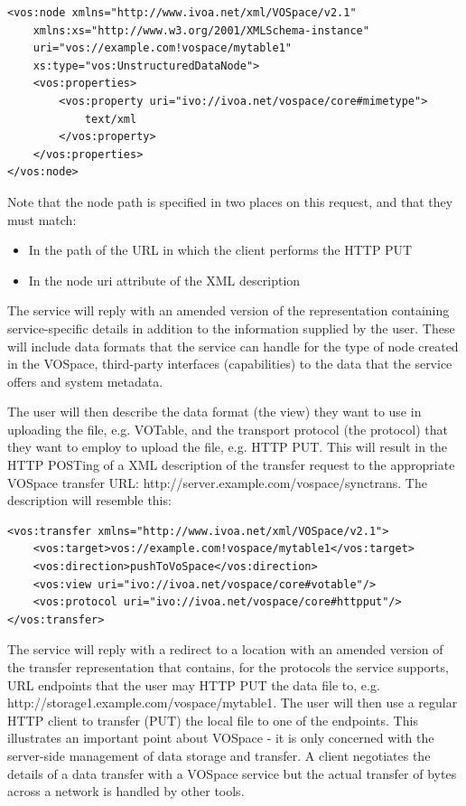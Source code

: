 \documentclass[11pt,a4paper]{ivoa}
\begin{document}
\begin{lstlisting}
<vos:node xmlns="http://www.ivoa.net/xml/VOSpace/v2.1"
    xmlns:xs="http://www.w3.org/2001/XMLSchema-instance" 
    uri="vos://example.com!vospace/mytable1"
    xs:type="vos:UnstructuredDataNode">  
    <vos:properties> 
        <vos:property uri="ivo://ivoa.net/vospace/core#mimetype">
            text/xml
        </vos:property>     
    </vos:properties> 
</vos:node> 
\end{lstlisting}
\noindent
Note that the node path is specified in two places on this request, and that they must match:
\begin{itemize}
   \item In the path of the URL in which the client performs the HTTP PUT
   \item In the node uri attribute of the XML description
\end{itemize}

The service will reply with an amended version of the representation containing service-specific details in addition to the information supplied by the user. These will include data formats that the service can handle for the type of node created in the VOSpace, third-party interfaces (capabilities) to the data that the service offers and system metadata.

The user will then describe the data format (the view) they want to use in uploading the file, e.g. VOTable, and the transport protocol (the protocol) that they want to employ to upload the file, e.g. HTTP PUT. This will result in the HTTP POSTing of a XML description of the transfer request to the appropriate VOSpace transfer URL:  http://server.example.com/vospace/synctrans. The description will resemble this:

\begin{lstlisting}
<vos:transfer xmlns="http://www.ivoa.net/xml/VOSpace/v2.1">
    <vos:target>vos://example.com!vospace/mytable1</vos:target>
    <vos:direction>pushToVoSpace</vos:direction> 
    <vos:view uri="ivo://ivoa.net/vospace/core#votable"/> 
    <vos:protocol uri="ivo://ivoa.net/vospace/core#httpput"/>  
</vos:transfer>
\end{lstlisting}

The service will reply with a redirect to a location with an amended version of the transfer representation that contains, for the protocols the service supports, URL endpoints that the user may HTTP PUT the data file to, e.g. http://storage1.example.com/vospace/mytable1.  The user will then use a regular HTTP client to transfer (PUT) the local file to one of the endpoints. This illustrates an important point about VOSpace - it is only concerned with the server-side management of data storage and transfer. A client negotiates the details of a data transfer with a VOSpace service but the actual transfer of bytes across a network is handled by other tools.
\end{document}
